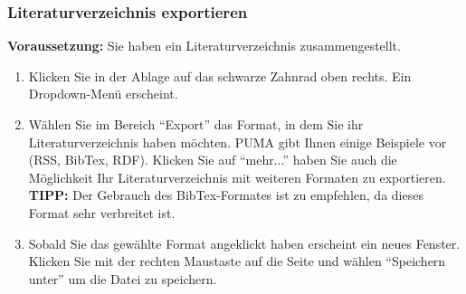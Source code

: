 \subsubsection{Literaturverzeichnis exportieren}
\textbf{Voraussetzung:} Sie haben ein Literaturverzeichnis zusammengestellt.
\begin{enumerate}
    \item Klicken Sie in der Ablage auf das schwarze Zahnrad oben rechts. Ein Dropdown-Menü erscheint.
    \item Wählen Sie im Bereich \enquote{Export} das Format, in dem Sie ihr Literaturverzeichnis haben möchten. PUMA gibt Ihnen einige Beispiele vor (RSS, BibTex, RDF). Klicken Sie auf \enquote{mehr...} haben Sie auch die Möglichkeit Ihr Literaturverzeichnis mit weiteren Formaten zu exportieren. \textbf{TIPP:} Der Gebrauch des BibTex-Formates ist zu empfehlen, da dieses Format sehr verbreitet ist.
    \item Sobald Sie das gewählte Format angeklickt haben erscheint ein neues Fenster. Klicken Sie mit der rechten Maustaste auf die Seite und wählen \enquote{Speichern unter} um die Datei zu speichern.
\end{enumerate}
